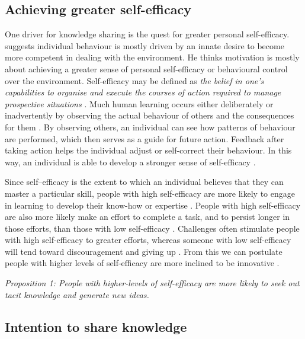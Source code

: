 \subsection{Achieving greater self-efficacy}

One driver for knowledge sharing is the quest for greater personal self-efficacy. \citet{white1959motivation} suggests individual behaviour is mostly driven by an innate desire to become more competent in dealing with the environment. He thinks motivation is mostly about achieving a greater sense of personal self-efficacy or behavioural control over the environment. Self-efficacy may be defined as \emph{the belief in one's capabilities to organise and execute the courses of action required to manage prospective situations} \citep{bandura1994self}. Much human learning occurs either deliberately or inadvertently by observing the actual behaviour of others and the consequences for them \citep{bandura1999social}. By observing others, an individual can see how patterns of behaviour are performed, which then serves as a guide for future action. Feedback after taking action helps the individual adjust or self-correct their behaviour. In this way, an individual is able to develop a stronger sense of self-efficacy \citep{bandura1977self}. \medskip

Since self–efficacy is the extent to which an individual believes that they can master a particular skill, people with high self-efficacy are more likely to engage in learning to develop their know-how or expertise \citep{bandura1986social,gist1989influence,zimmerman2000self}. People with high self-efficacy are also more likely make an effort to complete a task, and to persist longer in those efforts, than those with low self-efficacy \citep{schunk1990goal}. Challenges often stimulate people with high self-efficacy to greater efforts, whereas someone with low self-efficacy will tend toward discouragement and giving up \citep{gist1992self,zimmerman1992self}. From this we can postulate people with higher levels of self-efficacy are more inclined to be innovative \citep{tierney2002creative,endres2007tacit}. \medskip 

\emph{Proposition 1: People with higher-levels of self-efficacy are more likely to seek out tacit knowledge and generate new ideas.}

\subsection{Intention to share knowledge}

